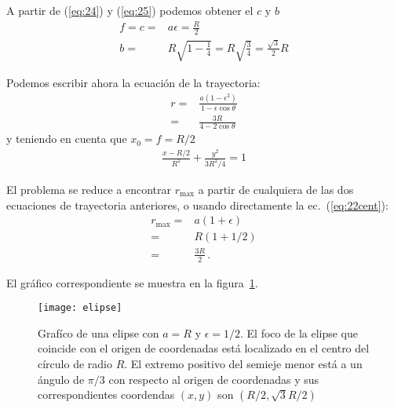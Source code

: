 A partir de (\ref{eq:24}) y (\ref{eq:25}) podemos obtener el $c$ y $b$ 
\begin{align}
  \label{eq:23}
  f=c=&a\epsilon=\frac{R}{2}\nonumber\\
  b=&R\sqrt{1-\frac{1}{4}}=R\sqrt{\frac{3}{4}}=\frac{\sqrt{3}}{2}R
\end{align}

Podemos escribir ahora la ecuación de la trayectoria:
\begin{align}
  \label{eq:tray1}
  r=&\frac{a(1-\epsilon^2)}{1-\epsilon\cos\theta}\nonumber\\
  =&\frac{3R}{4-2\cos\theta}
\end{align}
y teniendo en cuenta que $x_0=f=R/2$
\begin{align}
  \label{eq:tray2}
  \frac{x-R/2}{R^2}+\frac{y^2}{3R^2/4}=1
\end{align}


El problema se reduce a encontrar $r_{\text{max}}$ a partir de cualquiera de las dos ecuaciones de trayectoria anteriores, o usando directamente la ec.~(\ref{eq:22cent}):
\begin{align}
  r_{\text{max}}=&a(1+\epsilon)\nonumber\\
  =&R(1+1/2)\nonumber\\
  =&\frac{3R}{2}\,.
\end{align}



El gráfico correspondiente se muestra en la figura~\ref{fig:elipse}.
\begin{frame}  
\begin{figure}
  \centering
  \texttt{[image: elipse]}
  \caption{Grafíco de una elipse con $a=R$ y $\epsilon=1/2$. El foco de la elipse que coincide con el origen de coordenadas está localizado en el centro del círculo de radio $R$. El extremo positivo del semieje menor está a un ángulo de $\pi/3$ con respecto al origen de coordenadas y sus correspondientes coordendas $(x,y)$ son  $(R/2,\sqrt{3}R/2)$} 
  \label{fig:elipse}
\end{figure}
\end{frame}


